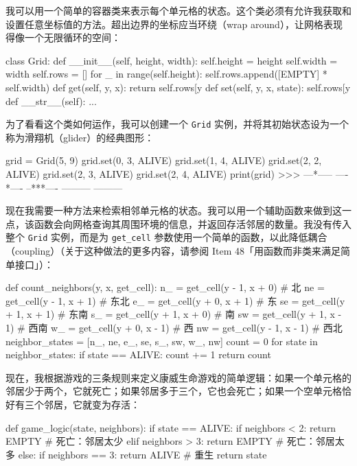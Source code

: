 我可以用一个简单的容器类来表示每个单元格的状态。这个类必须有允许我获取和设置任意坐标值的方法。超出边界的坐标应当环绕（wrap around），让网格表现得像一个无限循环的空间：

\begin{codebox}[python]
class Grid:
    def __init__(self, height, width):
        self.height = height
        self.width = width
        self.rows = []
        for _ in range(self.height):
            self.rows.append([EMPTY] * self.width)
    def get(self, y, x):
        return self.rows[y %
    def set(self, y, x, state):
        self.rows[y %
    def __str__(self):
        ...
\end{codebox}

为了看看这个类如何运作，我可以创建一个 \texttt{Grid} 实例，并将其初始状态设为一个称为滑翔机（glider）的经典图形：

\begin{codebox}[python]
grid = Grid(5, 9)
grid.set(0, 3, ALIVE)
grid.set(1, 4, ALIVE)
grid.set(2, 2, ALIVE)
grid.set(2, 3, ALIVE)
grid.set(2, 4, ALIVE)
print(grid)
>>>
---*-----
----*----
--***----
---------
---------
\end{codebox}

现在我需要一种方法来检索相邻单元格的状态。我可以用一个辅助函数来做到这一点，该函数会向网格查询其周围环境的信息，并返回存活邻居的数量。我没有传入整个 \texttt{Grid} 实例，而是为 \texttt{get\_cell} 参数使用一个简单的函数，以此降低耦合（coupling）（关于这种做法的更多内容，请参阅 Item 48「用函数而非类来满足简单接口」）：

\begin{codebox}[python]
def count_neighbors(y, x, get_cell):
    n_ = get_cell(y - 1, x + 0)  # 北
    ne = get_cell(y - 1, x + 1)  # 东北
    e_ = get_cell(y + 0, x + 1)  # 东
    se = get_cell(y + 1, x + 1)  # 东南
    s_ = get_cell(y + 1, x + 0)  # 南
    sw = get_cell(y + 1, x - 1)  # 西南
    w_ = get_cell(y + 0, x - 1)  # 西
    nw = get_cell(y - 1, x - 1)  # 西北
    neighbor_states = [n_, ne, e_, se, s_, sw, w_, nw]
    count = 0
    for state in neighbor_states:
        if state == ALIVE:
            count += 1
    return count
\end{codebox}

现在，我根据游戏的三条规则来定义康威生命游戏的简单逻辑：如果一个单元格的邻居少于两个，它就死亡；如果邻居多于三个，它也会死亡；如果一个空单元格恰好有三个邻居，它就变为存活：

\begin{codebox}[python]
def game_logic(state, neighbors):
    if state == ALIVE:
        if neighbors < 2:
            return EMPTY     # 死亡：邻居太少
        elif neighbors > 3:
            return EMPTY     # 死亡：邻居太多
    else:
        if neighbors == 3:
            return ALIVE     # 重生
    return state
\end{codebox}

